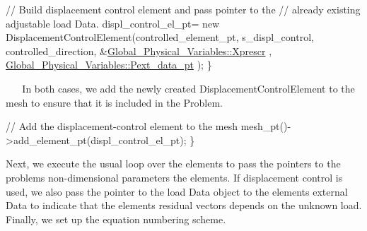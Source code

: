 \begin{DoxyItemize}
\begin{DoxyItemize}
\begin{DoxyCodeInclude}
     \textcolor{comment}{// Build displacement control element and pass pointer to the}
     \textcolor{comment}{// already existing adjustable load Data. }
     displ\_control\_el\_pt=
      \textcolor{keyword}{new}  DisplacementControlElement(controlled\_element\_pt,
                                      s\_displ\_control,
                                      controlled\_direction,
                                      &\hyperlink{namespaceGlobal__Physical__Variables_a1c774c9cb221df909201e81e84b15f40}{Global\_Physical\_Variables::Xprescr}
      ,
                                      \hyperlink{namespaceGlobal__Physical__Variables_a9d598320fb3d7ecf94101088e8f376d2}{Global\_Physical\_Variables::Pext\_data\_pt}
      );
    \}

\end{DoxyCodeInclude}

\end{DoxyItemize}~\newline
~\newline
 In both cases, we add the newly created {\ttfamily Displacement\+Control\+Element} to the mesh to ensure that it is included in the {\ttfamily Problem}. ~\newline
~\newline
 
\begin{DoxyCodeInclude}
   \textcolor{comment}{// Add the displacement-control element to the mesh}
   mesh\_pt()->add\_element\_pt(displ\_control\_el\_pt); 
  \}

\end{DoxyCodeInclude}

\end{DoxyItemize}Next, we execute the usual loop over the elements to pass the pointers to the problem\textquotesingle{}s non-\/dimensional parameters the elements. If displacement control is used, we also pass the pointer to the load {\ttfamily Data} object to the elements\textquotesingle{} external {\ttfamily Data} to indicate that the element\textquotesingle{}s residual vectors depends on the unknown load. Finally, we set up the equation numbering scheme.


